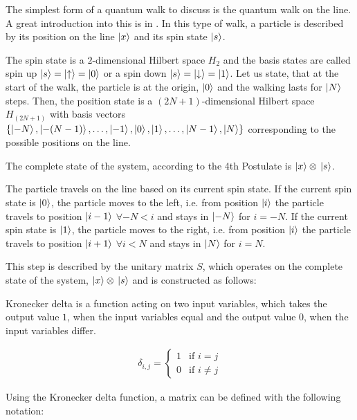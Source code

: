 The simplest form of a quantum walk to discuss is the quantum walk on the line. A great introduction into this is in \cite{KempeIntroduction}. In this type of walk, a particle is described by its position on the line $\ket{x}$ and its spin state $\ket{s}$.

The spin state is a $2$-dimensional Hilbert space $H_2$ and the basis states are called spin up $\ket{s} = \ket{\uparrow} = \ket{0}$ or a spin down $\ket{s} = \ket{\downarrow} = \ket{1}$. Let us state, that at the start of the walk, the particle is at the origin, $\ket{0}$ and the walking lasts for $\ket{N}$ steps. Then, the position state is a $(2N+1)$-dimensional Hilbert space $H_{(2N+1)}$ with basis vectors $\{\ket{-N},\ket{-(N-1)},\dots,\ket{-1},\ket{0},\ket{1},\dots,\ket{N-1},\ket{N}\}$ corresponding to the possible positions on the line.


The complete state of the system, according to the 4th Postulate is $\ket{x}\otimes{}\ket{s}$.

The particle travels on the line based on its current spin state. If the current spin state is $\ket{0}$, the particle moves to the left, i.e. from position $\ket{i}$ the particle travels to position $\ket{i-1}$ $\forall -N < i$ and stays in $\ket{-N}$ for $i=-N$. If the current spin state is $\ket{1}$, the particle moves to the right, i.e. from position $\ket{i}$ the particle travels to position $\ket{i+1}$ $\forall i<N$ and stays in $\ket{N}$ for $i=N$.

This step is described by the unitary matrix $S$, which operates on the complete state of the system, $\ket{x}\otimes{}\ket{s}$ and is constructed as follows:


 Kronecker delta is a function acting on two input variables, which takes the output value $1$, when the input variables equal and the output value $0$, when the input variables differ.

\begin{align}
    \delta_{i,j} =
    \begin{cases}
      1 & \text{if $i=j$}  \\
      0 & \text{if $i\neq{}j$}
    \end{cases}
  \end{align}

Using the Kronecker delta function, a matrix can be defined with the following notation:


